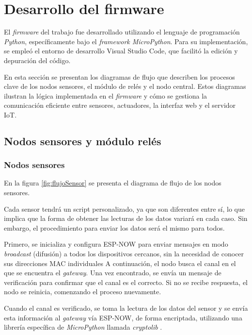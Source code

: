 \section{Desarrollo del firmware}

El \textit{firmware} del trabajo fue desarrollado utilizando el lenguaje de programación \textit{Python}, específicamente bajo el \textit{framework MicroPython}. Para su implementación, se empleó el entorno de desarrollo Visual Studio Code, que facilitó la edición y depuración del código.

En esta sección se presentan los diagramas de flujo que describen los procesos clave de los nodos sensores, el módulo de relés y el nodo central. Estos diagramas ilustran la lógica implementada en el \textit{firmware} y cómo se gestiona la comunicación eficiente entre sensores, actuadores, la interfaz web y el servidor IoT.

\subsection{Nodos sensores y módulo relés}

\subsubsection{Nodos sensores}

En la figura \ref{fig:flujoSensor} se presenta el diagrama de flujo de los nodos sensores. 

Cada sensor tendrá un script personalizado, ya que son diferentes entre sí, lo que implica que la forma de obtener las lecturas de los datos variará en cada caso. Sin embargo, el procedimiento para enviar los datos será el mismo para todos.

Primero, se inicializa y configura ESP-NOW para enviar mensajes en modo \textit{broadcast} (difusión) a todos los dispositivos cercanos, sin la necesidad de conocer sus direcciones MAC individuales
A continuación, el nodo busca el canal en el que se encuentra el \textit{gateway}. Una vez encontrado, se envía un mensaje de verificación para confirmar que el canal es el correcto. Si no se recibe respuesta, el nodo se reinicia, comenzando el proceso nuevamente.

Cuando el canal es verificado, se toma la lectura de los datos del sensor y se envía esta información al \textit{gateway} vía ESP-NOW, de forma encriptada, utilizando una librería específica de \textit{MicroPython} llamada \textit{cryptolib} \citep{docsmpy}.

